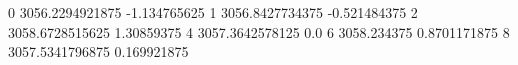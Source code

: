 0 3056.2294921875 -1.134765625
1 3056.8427734375 -0.521484375
2 3058.6728515625 1.30859375
4 3057.3642578125 0.0
6 3058.234375 0.8701171875
8 3057.5341796875 0.169921875
